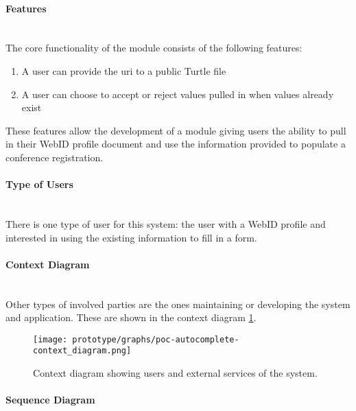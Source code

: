 \paragraph{Features}\mbox{}\\

The core functionality of the module consists of the following features: 

\vspace{-3mm}
\begin{enumerate}
    \item A user can provide the \gls{uri} to a public Turtle file
    \item A user can choose to accept or reject values pulled in when values already exist
\end{enumerate}
\vspace{-3mm}

These features allow the development of a module giving users the ability to pull in their WebID profile document and use the information provided to populate a conference registration.
\vspace{0.5cm}
\paragraph{Type of Users}\mbox{}\\

There is one type of user for this system: the user with a WebID profile and interested in using the existing information to fill in a form.
\vspace{0.5cm}
\paragraph{Context Diagram}\mbox{}\\

Other types of involved parties are the ones maintaining or developing the system and application. These are shown in the context diagram \ref{fig:poc-autocomplete-context_diagram}.

\begin{figure}[H]
    \centering
    \texttt{[image: prototype/graphs/poc-autocomplete-context\_diagram.png]}
    \caption{Context diagram showing users and external services of the system.}
    \label{fig:poc-autocomplete-context_diagram}
\end{figure}
\vspace{0.5cm}
\paragraph{Sequence Diagram}\mbox{}\\

